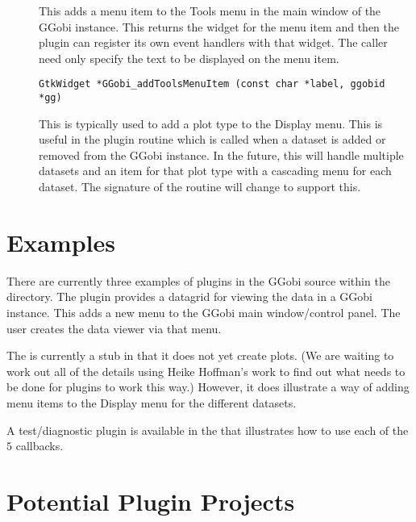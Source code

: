 \documentclass{article}
\begin{document}
\begin{description}
\item[]
This adds a menu item to the Tools menu in the main
window of the GGobi instance.
This returns the widget for the menu item and
then the plugin can register its own event handlers
with that widget.
The caller need only specify the text to be displayed
on the menu item.
\begin{verbatim}
GtkWidget *GGobi_addToolsMenuItem (const char *label, ggobid *gg)
\end{verbatim}

\item[] This is typically used to
add a plot type to the Display menu.  This is useful in the
 plugin routine which is called when a
dataset is added or removed from the GGobi instance.  In the future,
this will handle multiple datasets and an item for that plot type with
a cascading menu for each dataset.  The signature of the routine will
change to support this.
\end{description}



\section{Examples}

There are currently three examples of plugins in the GGobi source
within the  directory.  The  plugin
provides a datagrid for viewing the data in a GGobi instance.  This
adds a new menu to the GGobi main window/control panel.  The user
creates the data viewer via that menu.

The  is currently a stub in that it does not yet
create plots. (We are waiting to work out all of the details using
Heike Hoffman's work to find out what needs to be done for plugins to
work this way.) However, it does illustrate a way of adding menu items
to the Display menu for the different datasets.

A test/diagnostic plugin is available in the 
that illustrates how to use each of the $5$ callbacks.

\section{Potential Plugin Projects}
\end{document}
